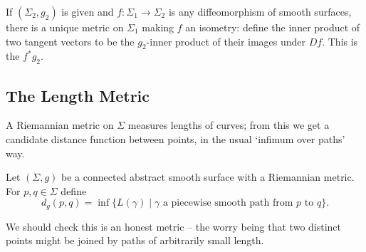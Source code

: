 \documentclass[a4paper]{scrartcl}
\begin{document}
\begin{example}
    If $(\Sigma_2, g_2)$ is given and $f: \Sigma_1 \rightarrow \Sigma_2$ is any diffeomorphism of smooth surfaces, there is a unique metric on $\Sigma_1$ making $f$ an isometry: define the inner product of two tangent vectors to be the $g_2$-inner product of their images under $Df$. This is the  $f^* g_2$.
\end{example}

\subsection{The Length Metric}

A Riemannian metric on $\Sigma$ measures lengths of curves; from this we get a candidate distance function between points, in the usual `infimum over paths' way.

\begin{definition}
    Let $(\Sigma, g)$ be a connected abstract smooth surface with a Riemannian metric. For $p, q \in \Sigma$ define
    $$
    d_g(p, q) = \inf \{L(\gamma) \mid \gamma \text{ a piecewise smooth path from } p \text{ to } q\}.
    $$
\end{definition}

We should check this is an honest metric -- the worry being that two distinct points might be joined by paths of arbitrarily small length.
\end{document}
